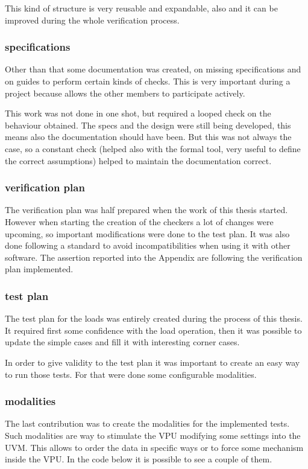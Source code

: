 This kind of structure is very reusable and expandable, also and it can be improved during the whole verification process.

\subsubsection{specifications}
Other than that some documentation was created, on missing specifications and on guides to perform certain kinds of checks. This is very important during a project because allows the other members to participate actively.

This work was not done in one shot, but required a looped check on the behaviour obtained. The specs and the design were still being developed, this means also the documentation should have been. But this was not always the case, so a constant check (helped also with the formal tool, very useful to define the correct assumptions) helped to maintain the documentation correct.

\subsubsection{verification plan}
The verification plan was half prepared when the work of this thesis started. However when starting the creation of the checkers a lot of changes were upcoming, so important modifications were done to the test plan. It was also done following a standard to avoid incompatibilities when using it with other software.
The assertion reported into the Appendix are following the verification plan implemented.

\subsubsection{test plan}
The test plan for the loads was entirely created during the process of this thesis. It required first some confidence with the load operation, then it was possible to update the simple cases and fill it with interesting corner cases.

In order to give validity to the test plan it was important to create an easy way to run those tests. For that were done some configurable modalities.


\subsubsection{modalities}
The last contribution was to create the modalities for the implemented tests. Such modalities are way to stimulate the VPU modifying some settings into the UVM. This allows to order the data in specific ways or to force some mechanism inside the VPU. In the code below it is possible to see a couple of them.

